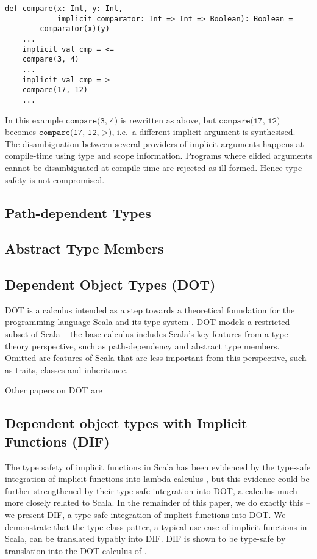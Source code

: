 \begin{minipage}{\linewidth}
\begin{lstlisting}[mathescape]
    def compare(x: Int, y: Int,
            implicit comparator: Int => Int => Boolean): Boolean =
        comparator(x)(y)
    ...
    implicit val cmp = <=
    compare(3, 4)
    ...
    implicit val cmp = >
    compare(17, 12)
    ...
\end{lstlisting}
\end{minipage}

In this example $\texttt{compare(3, 4)}$ is rewritten as above, but
$\texttt{compare(17, 12)}$ becomes $\texttt{compare(17, 12, >)}$, i.e.~a
different implicit argument is synthesised. The disambiguation between several
providers of implicit arguments happens at compile-time using type and scope
information. Programs where elided arguments cannot be disambiguated at
compile-time are rejected as ill-formed. Hence type-safety is not compromised.

\subsection{Path-dependent Types}
\TODOTHIS

\subsection{Abstract Type Members}
\TODOTHIS

\subsection{Dependent Object Types (DOT)}

DOT is a calculus intended as a step towards a theoretical foundation for the
programming language Scala and its type system \cite{AMO12}. DOT models a
restricted subset of Scala -- the base-calculus includes Scala's key features
from a type theory perspective, such as path-dependency and abstract type
members. Omitted are features of Scala that are less important from this
perspective, such as traits, classes and inheritance.

Other papers on DOT are \cite{ARO14, AR17, AR16}

\subsection{Dependent object types with Implicit Functions (DIF)}

The type safety of implicit functions in Scala has been evidenced by the
type-safe integration of implicit functions into lambda calculus \cite{OBLB18},
but this evidence could be further strengthened by their type-safe integration
into DOT, a calculus much more closely related to Scala. In the remainder of
this paper, we do exactly this -- we present DIF, a type-safe integration of
implicit functions into DOT. We demonstrate that the type class patter, a
typical use case of implicit functions in Scala, can be translated typably into
DIF. DIF is shown to be type-safe by translation into the DOT calculus of
\cite{AGORS16}.


